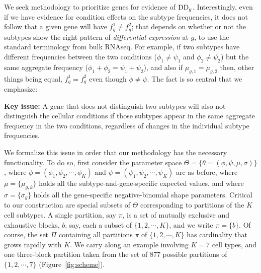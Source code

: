 \documentclass[aoas,preprint]{imsart}
\begin{document}
We seek methodology to prioritize genes for evidence
of ${\rm DD}_g$.  Interestingly, even if we have evidence for condition effects
on the subtype frequencies, it does not follow that a given
gene will have $f^1_g \neq f^2_g$; that depends on whether or not the subtypes
show the right pattern of {\em differential expression} at $g$, to use the 
standard terminology from bulk RNAseq.  For example, if two subtypes have 
different frequencies between the two conditions ($\phi_1 \neq \psi_1$ and 
 $\phi_2 \neq \psi_2$) but the same aggregate frequency
($\phi_1+\phi_2 = \psi_1 + \psi_2$),  and also  if $\mu_{g,1} = \mu_{g,2}$
then, other things being equal, $f^1_g = f^2_g$ even though $\phi \neq \psi$. The fact
is so central that we emphasize:


\noindent
{\bf Key issue:} A gene that does not distinguish two subtypes will also not distinguish
the cellular conditions if those subtypes appear in the same aggregate frequency
in the two conditions, regardless of changes in the individual subtype 
frequencies. 

 We formalize this issue in order that our methodology
has the necessary functionality.  To do so,  first consider the parameter space 
$\Theta = \{ \theta=(\phi, \psi,\mu, \sigma)  \}$,
where $\phi=(\phi_1, \phi_2, \cdots, \phi_K)$ and $\psi=(\psi_1, \psi_2, \cdots, \psi_K)$ 
are as before, where $\mu = \{ \mu_{g,k} \}$ holds  all the subtype-and-gene-specific expected
values, and where $\sigma = \{ \sigma_g \}$ holds all the gene-specific negative-binomial
shape parameters.  Critical to our construction are special subsets of $\Theta$ corresponding
to partitions of the $K$ cell subtypes.  A single partition, say $\pi$, is a set of
mutually exclusive and exhaustive blocks, $b$, say, each a subset of $\{1, 2, 
\cdots, K\}$, and we write $\pi = \{ b \}$.  Of course,
the set $\Pi$ containing all partitions $\pi$ of $\{1,2, \cdots, K\}$
 has cardinality that grows rapidly with $K$. 
 We carry along an example
involving $K=7$ cell types, and one three-block partition taken
from the set of 877 possible partitions of $\{1, 2, \cdots, 7\}$ (Figure~\ref{fig:scheme}).
\end{document}
